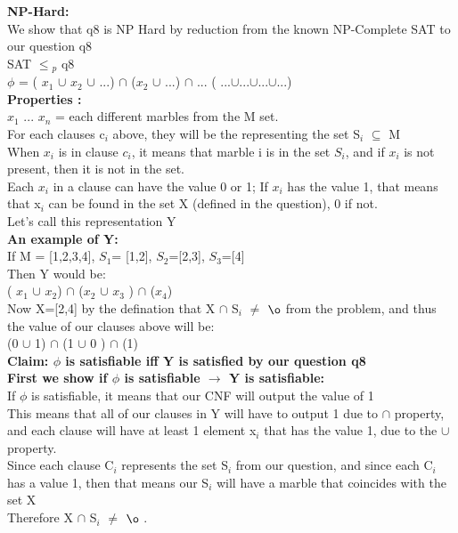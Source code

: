 \documentclass[10pt]{csc_assignment}
\begin{document}
\begin{description}
\textbf{NP-Hard:}\\
We show that q8 is NP Hard by reduction from the known NP-Complete SAT to our question q8\\ 
SAT $\leqslant$$_{p}$ q8 \\
$\phi$ = ( $x_{1}$ $\cup$ $x_{2}$ $\cup$ ...) $\cap$ ($x_{2}$ $\cup$ ...) $\cap$ ... ( ...$\cup$...$\cup$...$\cup$...)\\

\textbf{Properties :}\\
$x_{1}$ ... $x_{n}$ = each different marbles from the M set.\\
For each clauses c$_{i}$ above, they will be the representing the set S$_{i}$  $\subseteq$ M\\
When $x_{i}$ is in clause $c_{i}$, it means that marble i is in the set $S_{i}$, and if $x_{i}$ is not present, then it is not in the set.\\
Each $x_{i}$ in a clause can have the value 0 or 1; If $x_{i}$ has the value 1, that means that x$_{i}$ can be found in the set X (defined in the question), 0 if not.\\

Let's call this representation Y\\
\textbf{An example of Y:}\\
If M = [1,2,3,4], $S_{1}$= [1,2], $S_{2}$=[2,3], $S_{3}$=[4]\\
Then Y would be:\\
 ( $x_{1}$ $\cup$ $x_{2}$) $\cap$ ($x_{2}$ $\cup$ $x_{3}$ ) $\cap$ ($x_{4}$)\\

Now X=[2,4] by the defination that X $\cap$ S$_{i}$ $\not=$ ${\o}$ from the problem, and thus the value of our clauses above will be: \\
 (0 $\cup$ 1) $\cap$ (1 $\cup$ 0 ) $\cap$ (1)\\

\textbf{Claim: $\phi$ is satisfiable iff Y is satisfied by our question q8}\\

\textbf{First we show if $\phi$ is satisfiable $\rightarrow$ Y is satisfiable:}\\
If $\phi$ is satisfiable, it means that our CNF will output the value of 1\\
This means that all of our clauses in Y will have to output 1 due to $\cap$ property, and each clause will have at least 1 element x$_{i}$ that has the value 1, due to the $\cup$ property.\\
Since each clause C$_{i}$ represents the set S$_{i}$ from our question, and since each C$_{i}$ has a value 1, then that means our S$_{i}$ will have a marble that coincides with the set X\\
Therefore X $\cap$ S$_{i}$ $\not=$ ${\o}$ .\\


\end{description}
\end{document}
